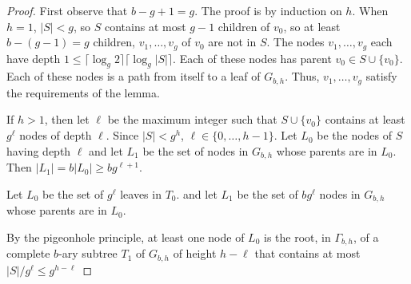 \documentclass{patmorin}
\begin{document}
\begin{proof}
  First observe that $b-g+1=g$.  The proof is by induction on $h$.  When $h=1$, $|S|< g$, so $S$ contains at most $g-1$ children of $v_0$, so at least $b-(g-1)=g$ children, $v_1,\ldots,v_g$ of $v_0$ are not in $S$.  The nodes $v_1,\ldots,v_g$ each have depth $1 \le\lceil \log_g 2\rceil \lceil\log_g|S|\rceil$.  Each of these nodes has parent $v_0\in S\cup\{v_0\}$.  Each  of these nodes is a path from itself to a leaf of $G_{b,h}$. Thus, $v_1,\ldots,v_g$ satisfy the requirements of the lemma.


  If $h>1$, then let $\ell$ be the maximum integer such that $S\cup\{v_0\}$ contains at least $g^\ell$ nodes of depth $\ell$. Since $|S|< g^h$, $\ell\in\{0,\ldots,h-1\}$.  Let $L_0$ be the nodes of $S$ having depth $\ell$ and let $L_1$ be the set of nodes in $G_{b,h}$ whose parents are in $L_0$.  Then $|L_1| = b|L_0| \ge bg^{\ell+1}$.

  Let $L_0$ be the set of $g^\ell$ leaves in $T_0$. and let $L_1$ be the set of $bg^\ell$ nodes in $G_{b,h}$ whose parents are in $L_0$.



    By the pigeonhole principle, at least one node of $L_0$ is the root, in $\Gamma_{b,h}$, of a complete $b$-ary subtree $T_1$ of $G_{b,h}$ of height $h-\ell$ that contains at most $|S|/g^\ell \le g^{h-\ell}$ 

\end{proof}







\end{document}
